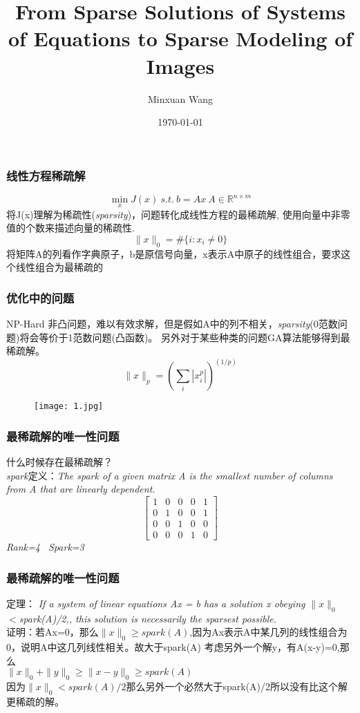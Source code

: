 \documentclass[UTF8]{beamer}
\begin{document}
    \title{From Sparse Solutions of
Systems of Equations to Sparse
Modeling of Images}
    \author{Minxuan Wang}
    \institute{}
    \date{\today}
    \frame{\titlepage}
\begin{frame}\frametitle{线性方程稀疏解}
\vspace{-2cm}
\begin{equation*}
\min \limits_{x} J(x)\ s.t.\ b=Ax \ A \in {\mathbb{R}}^{n \times m} 
\end{equation*}
\noindent\small\color{black}将J(x)理解为稀疏性(\emph{sparsity})，问题转化成线性方程的最稀疏解,
\noindent\small\color{black}使用向量中非零值的个数来描述向量的稀疏性.
\begin{equation*}
\| x\|_{0}=\#\{i:x_{i}\neq 0\}
\end{equation*}
\noindent 将矩阵A的列看作字典原子，b是原信号向量，x表示A中原子的线性组合，要求这个线性组合为最稀疏的
\end{frame}
\begin{frame}\frametitle{优化中的问题}
\noindent NP-Hard 非凸问题，难以有效求解，但是假如A中的列不相关，\emph{sparsity}(0范数问题)将会等价于1范数问题(凸函数)。
\noindent 另外对于某些种类的问题GA算法能够得到最稀疏解。
\begin{equation*}
\| x\|_{p}=( \sum_{i}|x_{i}^{p}|)^{(1/p)}
\end{equation*}
\vspace{-1cm}
\begin{figure}
\begin{center}
    \texttt{[image: 1.jpg]}
\end{center}
\end{figure}
\end{frame}
\begin{frame}\frametitle{最稀疏解的唯一性问题}
\noindent 什么时候存在最稀疏解？\\
\noindent \emph{spark}定义：\emph{The spark of a given matrix A is the smallest number
of columns from A that are linearly dependent.}
$$
\begin{bmatrix}
   1 & 0 & 0 & 0 & 1 \\
   0 & 1 & 0 & 0 & 1 \\
   0 & 0 & 1 & 0 & 0 \\
   0 & 0 & 0 & 1 & 0
  \end{bmatrix}
$$
\normalsize\emph{ Rank=4 \ Spark=3}
\end{frame}
\begin{frame}\frametitle{最稀疏解的唯一性问题}
定理：
\emph{If a system of linear equations Ax = b
has a solution x obeying $\|x\|_{0}$ $<$spark(A)/2,, this solution is necessarily the sparsest
possible.}\\
证明：若Ax=0，那么$\|x\|_{0} \geqslant spark(A)$,因为Ax表示A中某几列的线性组合为0，说明A中这几列线性相关。故大于spark(A)
考虑另外一个解y，有A(x-y)=0,那么\\ $\|x\|_{0}+\|y\|_{0} \geqslant \|x-y\|_{0} \geqslant spark(A) $ \\
因为$\|x\|_{0}<spark(A)/2$那么另外一个必然大于spark(A)/2所以没有比这个解更稀疏的解。
\end{frame}
\end{document}
